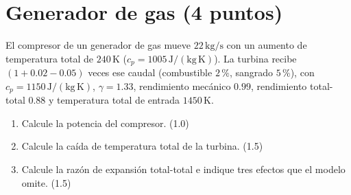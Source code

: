 \section{Generador de gas (4 puntos)}
El compresor de un generador de gas mueve $22\,\mathrm{kg/s}$ con un aumento de temperatura total de $240\,\mathrm K$ ($c_p=1005\,\mathrm{J/(kg\,K)}$). La turbina recibe $(1+0.02-0.05)$ veces ese caudal (combustible $2\,\%$, sangrado $5\,\%$), con $c_p=1150\,\mathrm{J/(kg\,K)}$, $\gamma=1.33$, rendimiento mecánico $0.99$, rendimiento total-total $0.88$ y temperatura total de entrada $1450\,\mathrm K$.
\begin{enumerate}[label=\alph*)]
\item Calcule la potencia del compresor. (1.0)
\item Calcule la caída de temperatura total de la turbina. (1.5)
\item Calcule la razón de expansión total-total e indique tres efectos que el modelo omite. (1.5)
\end{enumerate}

